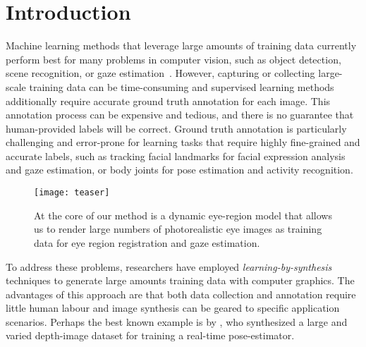 
\section{Introduction}


Machine learning methods that leverage large amounts of training data currently perform best for many problems in computer vision, such as object detection, scene recognition, or gaze estimation~\cite{zhou2014learning,girshick2014rich,zhang15_cvpr}.
However, capturing or collecting large-scale training data can be time-consuming
and supervised learning methods additionally require accurate ground truth annotation for each image.
This annotation process can be expensive and tedious, and there is no guarantee that human-provided labels will be correct.
Ground truth annotation is particularly challenging and error-prone for learning tasks that require highly fine-grained and accurate labels, such as tracking facial landmarks for facial expression analysis and gaze estimation, or body joints for pose estimation and activity recognition.

\begin{figure}
    \texttt{[image: teaser]}
    \caption{At the core of our method is a dynamic eye-region model that allows us to render large numbers of photorealistic eye images as training data for eye region registration and gaze estimation.}
    \label{fig:teaser}
\end{figure}

To address these problems, researchers have employed \emph{learning-by-synthesis} techniques to generate large amounts training data with computer graphics.
The advantages of this approach are that both data collection and annotation require little human labour and image synthesis can be geared to specific application scenarios.
Perhaps the best known example is by \citet{shotton2013real}, who synthesized a large and varied depth-image dataset for training a real-time pose-estimator.

